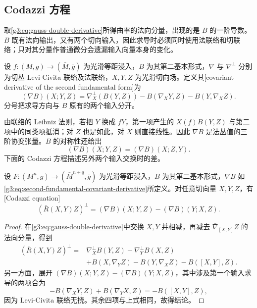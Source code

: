 \subsection{Codazzi 方程}
\label{g3:subsec:0402:02}

取\eqref{g3:eq:gauss-double-derivative}所得曲率的法向分量，出现的是 \(B\) 的一阶导数。\(B\) 既有法向输出，又有两个切向输入，因此求导时必须同时使用法联络和切联络；只对其分量作普通微分会遗漏输入向量本身的变化。

\begin{definition}\label{g3:def:second-fundamental-covariant-derivative}
	设 \(f:(M,g)\to(\bar M,\bar g)\) 为光滑等距浸入，\(B\) 为其第二基本形式，\(\nabla\) 与 \(\nabla^\perp\) 分别为切丛 Levi-Civita 联络及法联络，\(X,Y,Z\) 为光滑切向场。定义其[covariant derivative of the second fundamental form]为
	\begin{equation}\label{g3:eq:second-fundamental-covariant-derivative}
		(\nabla B)(X;Y,Z)
		=\nabla_X^\perp(B(Y,Z))
		-B(\nabla_XY,Z)-B(Y,\nabla_XZ).
	\end{equation}
	分号把求导方向与 \(B\) 原有的两个输入分开。
\end{definition}

由联络的 Leibniz 法则，若把 \(Y\) 换成 \(fY\)，第一项产生的 \(X(f)B(Y,Z)\) 与第二项中的同类项抵消；对 \(Z\) 也是如此，对 \(X\) 则直接线性。因此 \(\nabla B\) 是法丛值的三阶协变张量。\(B\) 的对称性还给出
\[
	(\nabla B)(X;Y,Z)=(\nabla B)(X;Z,Y).
\]
下面的 Codazzi 方程描述另外两个输入交换时的差。

\begin{theorem}\label{g3:thm:codazzi-equation}
	设 \(F\colon(M^n,g)\to(\bar M^{n+q},\bar g)\) 为光滑等距浸入，\(B\) 为其第二基本形式，\(\nabla B\) 如\eqref{g3:eq:second-fundamental-covariant-derivative}所定义。对任意切向量 \(X,Y,Z\)，有[Codazzi equation]
	\begin{equation}\label{g3:eq:codazzi-equation}
		(\bar R(X,Y)Z)^\perp
		=(\nabla B)(X;Y,Z)-(\nabla B)(Y;X,Z).
	\end{equation}
\end{theorem}
\begin{proof}
	在\eqref{g3:eq:gauss-double-derivative}中交换 \(X,Y\) 并相减，再减去 \(\bar\nabla_{[X,Y]}Z\) 的法向分量，得到
	\[
		\begin{aligned}
		(\bar R(X,Y)Z)^\perp
		={}&\nabla_X^\perp B(Y,Z)-\nabla_Y^\perp B(X,Z)\\
		&+B(X,\nabla_YZ)-B(Y,\nabla_XZ)-B([X,Y],Z).
		\end{aligned}
	\]
	另一方面，展开 \((\nabla B)(X;Y,Z)-(\nabla B)(Y;X,Z)\)，其中涉及第一个输入求导的两项合为
	\[
		-B(\nabla_XY,Z)+B(\nabla_YX,Z)
		=-B([X,Y],Z),
	\]
	因为 Levi-Civita 联络无挠。其余四项与上式相同，故得结论。
\end{proof}

